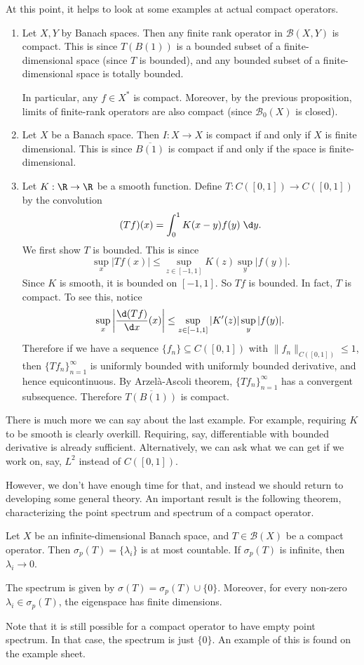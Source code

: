 \documentclass[a4paper]{article}
\begin{document}
At this point, it helps to look at some examples at actual compact operators.
\begin{eg}\leavevmode
  \begin{enumerate}
    \item Let $X, Y$ by Banach spaces. Then any finite rank operator in $\mathcal{B}(X, Y)$ is compact. This is since $T(B(1))$ is a bounded subset of a finite-dimensional space (since $T$ is bounded), and any bounded subset of a finite-dimensional space is totally bounded.

      In particular, any $f \in X^*$ is compact. Moreover, by the previous proposition, limits of finite-rank operators are also compact (since $\mathcal{B}_0(X)$ is closed).
    \item Let $X$ be a Banach space. Then $I: X \to X$ is compact if and only if $X$ is finite dimensional. This is since $\overline{B(1)}$ is compact if and only if the space is finite-dimensional.
    \item Let $K: \R \to \R$ be a smooth function. Define $T: C([0, 1]) \to C([0, 1])$ by the convolution
      \[
        (T f)(x) = \int_0^1 K(x - y) f(y)\;\d y.
      \]
      We first show $T$ is bounded. This is since
      \[
        \sup_x |T f(x)| \leq \sup_{z \in [-1, 1]} K(z) \sup_y |f(y)|.
      \]
      Since $K$ is smooth, it is bounded on $[-1, 1]$. So $Tf$ is bounded. In fact, $T$ is compact. To see this, notice
      \[
        \sup_x \left|\frac{\d (Tf)}{\d x}(x)\right| \leq \sup_{z \in [-1, 1]} |K'(z)| \sup_y |f(y)|.
      \]
      Therefore if we have a sequence $\{f_n\} \subseteq C([0, 1])$ with $\|f_n\|_{C([0, 1])} \leq 1$, then $\{T f_n\}_{n = 1}^\infty$ is uniformly bounded with uniformly bounded derivative, and hence equicontinuous. By Arzel\`a-Ascoli theorem, $\{T f_n\}_{n = 1}^\infty$ has a convergent subsequence. Therefore $\overline{T(B(1))}$ is compact.
  \end{enumerate}
\end{eg}
There is much more we can say about the last example. For example, requiring $K$ to be smooth is clearly overkill. Requiring, say, differentiable with bounded derivative is already sufficient. Alternatively, we can ask what we can get if we work on, say, $L^2$ instead of $C([0, 1])$.

However, we don't have enough time for that, and instead we should return to developing some general theory. An important result is the following theorem, characterizing the point spectrum and spectrum of a compact operator.
\begin{thm}
  Let $X$ be an infinite-dimensional Banach space, and $T \in \mathcal{B}(X)$ be a compact operator. Then $\sigma_p(T) = \{\lambda_i\}$ is at most countable. If $\sigma_p(T)$ is infinite, then $\lambda_i \to 0$.

  The spectrum is given by $\sigma(T) = \sigma_p(T) \cup \{0\}$. Moreover, for every non-zero $\lambda_i \in \sigma_p (T)$, the eigenspace has finite dimensions.
\end{thm}
Note that it is still possible for a compact operator to have empty point spectrum. In that case, the spectrum is just $\{0\}$. An example of this is found on the example sheet.
\end{document}
